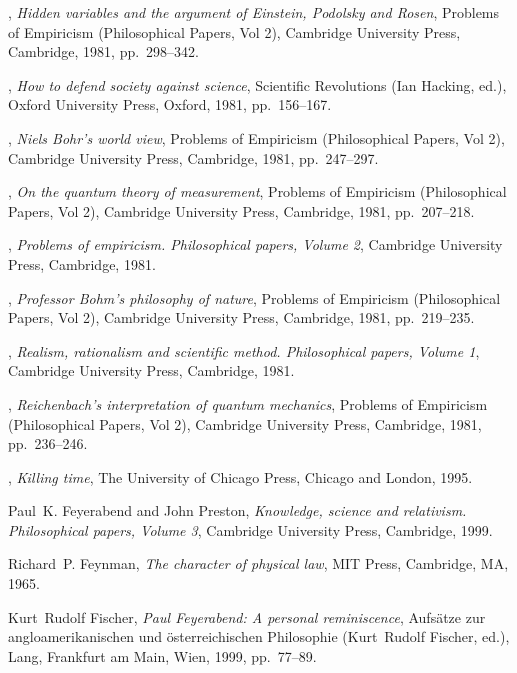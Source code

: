 \documentclass{article}
\begin{document}
\begin{thebibliography}{10}
\bysame, \emph{Hidden variables and the argument of {E}instein, {P}odolsky and
  {R}osen}, Problems of Empiricism (Philosophical Papers, Vol 2), Cambridge
  University Press, Cambridge, 1981, pp.~298--342.

\bysame, \emph{How to defend society against science}, Scientific Revolutions
  (Ian Hacking, ed.), Oxford University Press, Oxford, 1981, pp.~156--167.

\bysame, \emph{{N}iels {B}ohr's world view}, Problems of Empiricism
  (Philosophical Papers, Vol 2), Cambridge University Press, Cambridge, 1981,
  pp.~247--297.

\bysame, \emph{On the quantum theory of measurement}, Problems of Empiricism
  (Philosophical Papers, Vol 2), Cambridge University Press, Cambridge, 1981,
  pp.~207--218.

\bysame, \emph{Problems of empiricism. {P}hilosophical papers, Volume 2},
  Cambridge University Press, Cambridge, 1981.

\bysame, \emph{Professor {B}ohm's philosophy of nature}, Problems of Empiricism
  (Philosophical Papers, Vol 2), Cambridge University Press, Cambridge, 1981,
  pp.~219--235.

\bysame, \emph{Realism, rationalism and scientific method. {P}hilosophical
  papers, Volume 1}, Cambridge University Press, Cambridge, 1981.

\bysame, \emph{{R}eichenbach's interpretation of quantum mechanics}, Problems
  of Empiricism (Philosophical Papers, Vol 2), Cambridge University Press,
  Cambridge, 1981, pp.~236--246.

\bysame, \emph{Killing time}, The University of Chicago Press, Chicago and
  London, 1995.

Paul~K. Feyerabend and John Preston, \emph{Knowledge, science and relativism.
  {P}hilosophical papers, Volume 3}, Cambridge University Press, Cambridge,
  1999.

Richard~P. Feynman, \emph{The character of physical law}, MIT Press, Cambridge,
  MA, 1965.

Kurt~Rudolf Fischer, \emph{{P}aul {F}eyerabend: A personal reminiscence},
  Aufs{\"{a}}tze zur angloamerikanischen und {\"{o}}sterreichischen Philosophie
  (Kurt~Rudolf Fischer, ed.), Lang, Frankfurt am Main, Wien, 1999, pp.~77--89.


\end{thebibliography}
\end{document}
